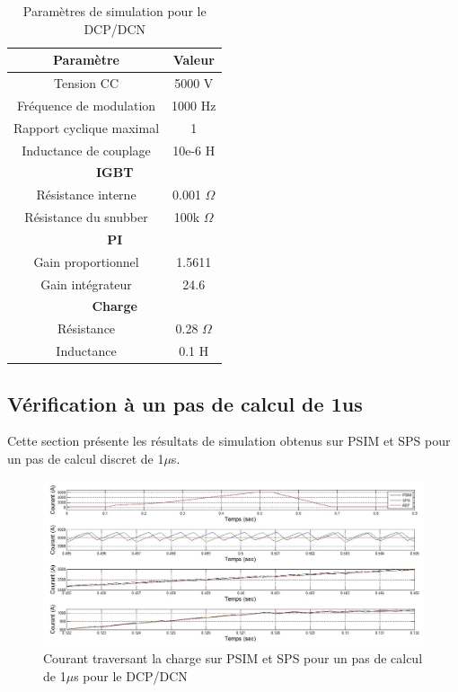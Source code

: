 \documentclass[11pt,letterpaper,final]{report}
\begin{document}
\begin{table}[htb]
\centering
\begin{tabular}{|c|c|} 
  \hline
  \textbf{Paramètre} & \textbf{Valeur}  \\
  \hline\hline
  Tension CC & 5000 V\\ \hline
  Fréquence de modulation & 1000 Hz\\ \hline
  Rapport cyclique maximal & 1 \\ \hline
  Inductance de couplage & 10e-6 H \\ \hline \hline
  \multicolumn{2}{|c|}{\textbf{IGBT}}\\ \hline
  Résistance interne & 0.001 $\Omega$\\
  Résistance du snubber  & 100k $\Omega$\\ \hline \hline
   \multicolumn{2}{|c|}{\textbf{PI}}\\ \hline
  Gain proportionnel & 1.5611 \\
  Gain intégrateur & 24.6 \\ \hline \hline
  \multicolumn{2}{|c|}{\textbf{Charge}}\\ \hline
  Résistance & 0.28 $\Omega$\\
  Inductance & 0.1 H \\
  \hline
\end{tabular}
\caption{Paramètres de simulation pour le DCP/DCN}
\label{p_DCP}
\end{table}


\subsection{Vérification à un pas de calcul de 1us}
Cette section présente les résultats de simulation obtenus sur PSIM et SPS pour un pas de calcul discret de 1$\mu$s.



\begin{figure}[htb]
\centering
\includegraphics[scale=0.5]{Fig/DCPDCN/DCPCourantCharge1u.jpg}
\caption{Courant traversant la charge sur PSIM et SPS pour un pas de calcul de 1$\mu$s pour le DCP/DCN}
\label{DC_ch_cou_1}
\end{figure}
\end{document}
